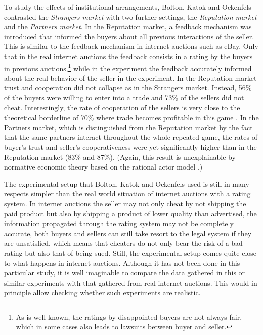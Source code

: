 To study the effects of institutional arrangements, Bolton, Katok and
Ockenfels contrasted the {\em Strangers market} with two further settings, the
{\em Reputation market} and the {\em Partners market}. In the Reputation
market, a feedback mechanism was introduced that informed the buyers about all
previous interactions of the seller. This is similar to the feedback mechanism
in internet auctions such as eBay. Only that in the real internet auctions the
feedback consists in a rating by the buyers in previous auctions,\footnote{As
  is well known, the ratings by disappointed buyers are not always fair, which
  in some cases also leads to lawsuits between buyer and seller.}  while in
the experiment the feedback accurately informed about the real behavior of
the seller in the experiment. In the Reputation market trust and cooperation
did not collapse as in the Strangers market. Instead, 56\% of the buyers were
willing to enter into a trade and 73\% of the sellers did not cheat.
Interestingly, the rate of cooperation of the sellers is very close to the
theoretical borderline of 70\% where trade becomes profitable in this game
\cite[p.\ 198]{bolton-katok-ockenfels:2004}. In the Partners market, which is
distinguished from the Reputation market by the fact that the same partners
interact throughout the whole repeated game, the rates of buyer's trust and
seller's cooperativeness were yet significantly higher than in the Reputation
market (83\% and 87\%). (Again, this result is unexplainable by normative
economic theory based on the rational actor model \cite[p.
199]{bolton-katok-ockenfels:2004}.)

The experimental setup that Bolton, Katok and Ockenfels used is still
in many respects simpler than the real world situation of internet auctions
with a rating system. In internet auctions the seller may not only cheat by
not shipping the paid product but also by shipping a product of lower
quality than advertised, the information propagated through the rating system
may not be completely accurate, both buyers and sellers can still take resort
to the legal system if they are unsatisfied, which means that cheaters do not
only bear the risk of a bad rating but also that of being sued. Still, the
experimental setup comes quite close to what happens in internet auctions.
Although it has not been done in this particular study, it is well imaginable
to compare the data gathered in this or similar experiments with that gathered
from real internet auctions. This would in principle allow checking whether
such experiments are realistic.

